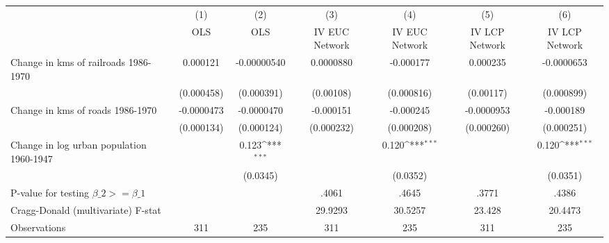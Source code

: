{
\def\sym#1{\ifmmode^{#1}\else\(^{#1}\)\fi}
\begin{tabular}{l*{6}{c}}
\hline\hline
                &\multicolumn{1}{c}{(1)}&\multicolumn{1}{c}{(2)}&\multicolumn{1}{c}{(3)}&\multicolumn{1}{c}{(4)}&\multicolumn{1}{c}{(5)}&\multicolumn{1}{c}{(6)}\\
                &\multicolumn{1}{c}{OLS}&\multicolumn{1}{c}{OLS}&\multicolumn{1}{c}{IV EUC Network}&\multicolumn{1}{c}{IV EUC Network}&\multicolumn{1}{c}{IV LCP Network}&\multicolumn{1}{c}{IV LCP Network}\\
\hline
Change in kms of railroads 1986-1970& 0.000121         &-0.00000540         &0.0000880         &-0.000177         & 0.000235         &-0.0000653         \\
                &(0.000458)         &(0.000391)         &(0.00108)         &(0.000816)         &(0.00117)         &(0.000899)         \\
[1em]
Change in kms of roads 1986-1970&-0.0000473         &-0.0000470         &-0.000151         &-0.000245         &-0.0000953         &-0.000189         \\
                &(0.000134)         &(0.000124)         &(0.000232)         &(0.000208)         &(0.000260)         &(0.000251)         \\
[1em]
Change in log urban population 1960-1947&                  &    0.123\sym{***}&                  &    0.120\sym{***}&                  &    0.120\sym{***}\\
                &                  & (0.0345)         &                  & (0.0352)         &                  & (0.0351)         \\
\hline
P-value for testing $\beta\_{2} >= \beta\_{1}$&                  &                  &    .4061         &    .4645         &    .3771         &    .4386         \\
Cragg-Donald (multivariate) F-stat&                  &                  &  29.9293         &  30.5257         &   23.428         &  20.4473         \\
Observations    &      311         &      235         &      311         &      235         &      311         &      235         \\
\hline\hline
\end{tabular}
}
